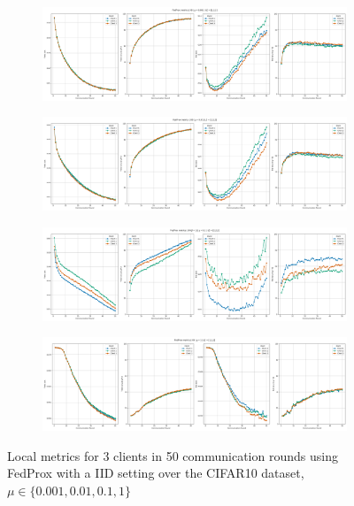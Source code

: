 \begin{figure}[H]
    \centering

    \begin{subfigure}{\linewidth}
        \centering
        \includegraphics[width=0.8\linewidth]{figures/2-Federated_Learning/FedProx_IID_Mu_0.001.png}
    \end{subfigure}
    \vspace{1em} %

    \begin{subfigure}{\linewidth}
        \centering
        \includegraphics[width=0.8\linewidth]{figures/2-Federated_Learning/FedProx_IID_Mu_0.01.png}
    \end{subfigure}
    \vspace{1em} %

    \begin{subfigure}{\linewidth}
        \centering
        \includegraphics[width=0.8\linewidth]{figures/2-Federated_Learning/FedProx_Dirichlet_1_mu_0.1.png}
    \end{subfigure}
    \vspace{1em} %

    \begin{subfigure}{\linewidth}
        \centering
        \includegraphics[width=0.8\linewidth]{figures/2-Federated_Learning/FedProx_IID_Mu_1.png}
    \end{subfigure}

    \caption{Local metrics for 3 clients in 50 communication rounds using FedProx with a IID setting over the CIFAR10 dataset, $\mu \in \{0.001, 0.01, 0.1, 1\}$}
    \label{fig:FedProx_IID}
\end{figure}

